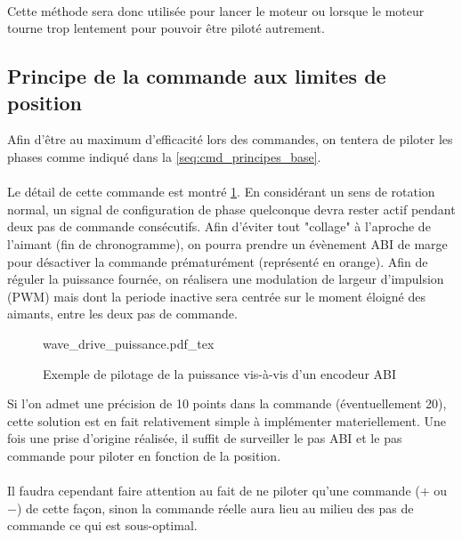 \paragraph{}
Cette méthode sera donc utilisée pour lancer le moteur ou lorsque le moteur tourne trop lentement pour pouvoir être piloté autrement.

\subsection{Principe de la commande aux limites de position}
\label{sec:cmd_limite_position}
Afin d'être au maximum d'efficacité lors des commandes, on tentera de piloter les phases comme indiqué dans la \cref{seq:cmd_principes_base}.

\paragraph{}
Le détail de cette commande est montré \cref{fig:wave_drive_wrt_abi}. 
En considérant un sens de rotation normal, un signal de configuration de phase quelconque devra rester actif pendant deux pas de commande consécutifs.
Afin d'éviter tout "collage" à l'aproche de l'aimant (fin de chronogramme), on pourra prendre un évènement ABI de marge pour désactiver la commande prématurément (représenté en orange).
Afin de réguler la puissance fournée, on réalisera une modulation de largeur d'impulsion (PWM) mais dont la periode inactive sera centrée sur le moment éloigné des aimants, entre les deux pas de commande.

\begin{figure}[h]
    \centering
    \def\svgwidth{17cm}
    \small
    {wave_drive_puissance.pdf_tex}
    \caption{Exemple de pilotage de la puissance vis-à-vis d'un encodeur ABI}
    \label{fig:wave_drive_wrt_abi}
\end{figure}

Si l'on admet une précision de 10 points dans la commande (éventuellement 20), cette solution est en fait relativement simple à implémenter materiellement.
Une fois une prise d'origine réalisée, il suffit de surveiller le pas ABI et le pas commande pour piloter en fonction de la position.

\paragraph{}
Il faudra cependant faire attention au fait de ne piloter qu'une commande ($+$ ou $-$) de cette façon, sinon la commande réelle aura lieu au milieu des pas de commande ce qui est sous-optimal.

